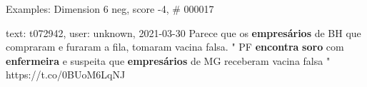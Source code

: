 \begin{frame}{Examples: Dimension 6 neg, score -4, \# 000017}
\footnotesize
\begin{alertblock}{text: t072942, user: unknown, 2021-03-30}
Parece que os \textbf{empresários} de BH que compraram e furaram a fila, 
tomaram vacina falsa.  " PF 
\textbf{encontra} \textbf{soro} com \textbf{enfermeira} e suspeita que 
\textbf{empresários} de MG receberam vacina falsa " https://t.co/0BUoM6LqNJ 
\end{alertblock}
\end{frame}
